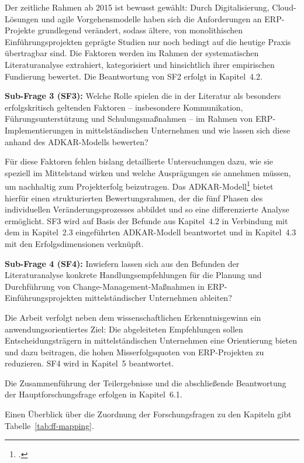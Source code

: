 Der zeitliche Rahmen ab 2015 ist bewusst gew\"ahlt: Durch Digitalisierung, Cloud-L\"osungen und agile Vorgehensmodelle haben sich die Anforderungen an ERP-Projekte grundlegend ver\"andert, sodass \"altere, von monolithischen Einf\"uhrungsprojekten gepr\"agte Studien nur noch bedingt auf die heutige Praxis \"ubertragbar sind. Die Faktoren werden im Rahmen der systematischen Literaturanalyse extrahiert, kategorisiert und hinsichtlich ihrer empirischen Fundierung bewertet. Die Beantwortung von SF2 erfolgt in Kapitel~4.2.

\textbf{Sub-Frage 3 (SF3):} Welche Rolle spielen die in der Literatur als besonders erfolgskritisch geltenden Faktoren -- insbesondere Kommunikation, F\"uhrungsunterst\"utzung und Schulungsma\ss{}nahmen -- im Rahmen von ERP-Implementierungen in mittelst\"andischen Unternehmen und wie lassen sich diese anhand des ADKAR-Modells bewerten?

F\"ur diese Faktoren fehlen bislang detaillierte Untersuchungen dazu, wie sie speziell im Mittelstand wirken und welche Auspr\"agungen sie annehmen m\"ussen, um nachhaltig zum Projekterfolg beizutragen. Das ADKAR-Modell\footcite[Vgl.]{hiatt2006} bietet hierf\"ur einen strukturierten Bewertungsrahmen, der die f\"unf Phasen des individuellen Ver\"anderungsprozesses abbildet und so eine differenzierte Analyse erm\"oglicht. SF3 wird auf Basis der Befunde aus Kapitel~4.2 in Verbindung mit dem in Kapitel~2.3 eingef\"uhrten ADKAR-Modell beantwortet und in Kapitel~4.3 mit den Erfolgsdimensionen verkn\"upft.

\textbf{Sub-Frage 4 (SF4):} Inwiefern lassen sich aus den Befunden der Literaturanalyse konkrete Handlungsempfehlungen f\"ur die Planung und Durchf\"uhrung von Change-Management-Ma\ss{}nahmen in ERP-Einf\"uhrungsprojekten mittelst\"andischer Unternehmen ableiten?

Die Arbeit verfolgt neben dem wissenschaftlichen Erkenntnisgewinn ein anwendungsorientiertes Ziel: Die abgeleiteten Empfehlungen sollen Entscheidungstr\"agern in mittelst\"andischen Unternehmen eine Orientierung bieten und dazu beitragen, die hohen Misserfolgsquoten von ERP-Projekten zu reduzieren. SF4 wird in Kapitel~5 beantwortet.

Die Zusammenf\"uhrung der Teilergebnisse und die abschlie\ss{}ende Beantwortung der Hauptforschungsfrage erfolgen in Kapitel~6.1.

Einen \"Uberblick \"uber die Zuordnung der Forschungsfragen zu den Kapiteln gibt Tabelle~\ref{tab:ff-mapping}.

